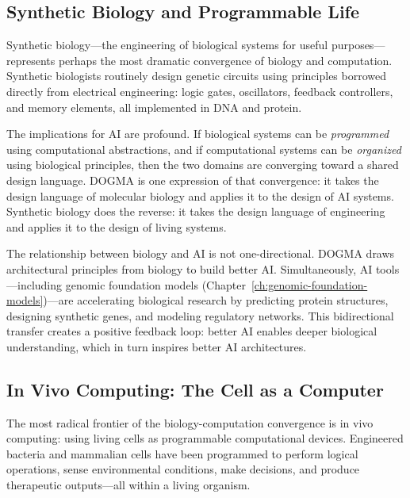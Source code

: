 \subsection{Synthetic Biology and Programmable Life}

Synthetic biology---the engineering of biological systems for useful purposes---represents perhaps the most dramatic convergence of biology and computation. Synthetic biologists routinely design genetic circuits using principles borrowed directly from electrical engineering: logic gates, oscillators, feedback controllers, and memory elements, all implemented in DNA and protein.

The implications for AI are profound. If biological systems can be \emph{programmed} using computational abstractions, and if computational systems can be \emph{organized} using biological principles, then the two domains are converging toward a shared design language. DOGMA is one expression of that convergence: it takes the design language of molecular biology and applies it to the design of AI systems. Synthetic biology does the reverse: it takes the design language of engineering and applies it to the design of living systems.

\begin{keyinsight}
The relationship between biology and AI is not one-directional. DOGMA draws architectural principles from biology to build better AI. Simultaneously, AI tools---including genomic foundation models (Chapter~\ref{ch:genomic-foundation-models})---are accelerating biological research by predicting protein structures, designing synthetic genes, and modeling regulatory networks. This bidirectional transfer creates a positive feedback loop: better AI enables deeper biological understanding, which in turn inspires better AI architectures.
\end{keyinsight}

\subsection{In Vivo Computing: The Cell as a Computer}

The most radical frontier of the biology-computation convergence is in vivo computing: using living cells as programmable computational devices. Engineered bacteria and mammalian cells have been programmed to perform logical operations, sense environmental conditions, make decisions, and produce therapeutic outputs---all within a living organism.

